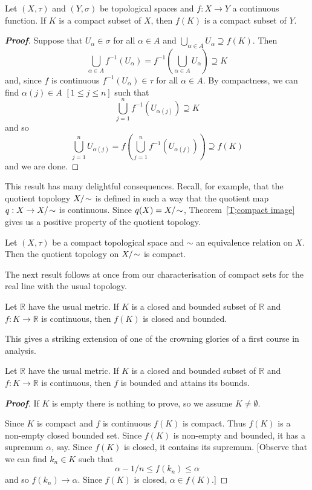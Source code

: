 \begin{theorem}\label{T;compact image}
Let $(X,\tau)$ and $(Y,\sigma)$
be topological spaces and $f:X\rightarrow Y$ a continuous
function. If $K$ is a compact subset of $X$,
then $f(K)$ is a compact subset of $Y$.
\end{theorem}
\begin{proof}[\bf Proof] Suppose that $U_{\alpha}\in\sigma$
for all $\alpha\in A$
and $\bigcup_{\alpha\in A}U_{\alpha}\supseteq f(K)$.
Then
\[\bigcup_{\alpha\in A}f^{-1}(U_{\alpha})
=f^{-1}\left(\bigcup_{\alpha\in A}U_{\alpha}\right)\supseteq K\]
and, since $f$ is continuous $f^{-1}(U_{\alpha})\in\tau$
for all $\alpha\in A$. By compactness, we can find
$\alpha(j)\in A$ $[1\leq j\leq n]$ such that
\[\bigcup_{j=1}^{n}f^{-1}(U_{\alpha(j)})\supseteq K\]
and so
\[\bigcup_{j=1}^{n}U_{\alpha(j)}=
f\left(\bigcup_{j=1}^{n}f^{-1}(U_{\alpha(j)})\right)
\supseteq f(K)\]
and we are done.
\end{proof}


This result has many delightful consequences.
Recall, for example, that the quotient topology
$X/\negthinspace\sim$ is defined in such a way that the
quotient map $q:X\rightarrow X/\negthinspace\sim$ is continuous.
Since $q(X)=X/\negthinspace\sim$,
Theorem~\ref{T;compact image} gives us
a positive property of the quotient topology.


\begin{theorem}\label{T;quotient compact}
Let $(X,\tau)$ be a compact topological space
and $\sim$ an equivalence relation on $X$.
Then the quotient topology on $X/\negthinspace\sim$ is compact.
\end{theorem}

The next result follows at once from our
characterisation of compact sets for the real
line with the usual topology.
\begin{theorem}
Let ${\mathbb R}$ have the usual metric.
If $K$ is a closed and bounded subset of ${\mathbb R}$
and $f:K\rightarrow{\mathbb R}$ is continuous,
then $f(K)$ is closed and bounded.
\end{theorem}
This gives a striking extension of one of the
crowning glories of a first course in analysis.


\begin{theorem}\label{T;attains bounds}
Let ${\mathbb R}$ have the usual metric.
If $K$ is a
closed and bounded subset of ${\mathbb R}$
and $f:K\rightarrow{\mathbb R}$ is continuous,
then $f$ is bounded and attains its bounds.
\end{theorem}
\begin{proof}[\bf Proof] If $K$ is empty there is nothing to prove,
so we assume $K\neq\emptyset$.

Since $K$ is compact and $f$ is continuous
$f(K)$ is compact. Thus $f(K)$ is a non-empty closed
bounded set. Since $f(K)$ is non-empty and bounded,
it has a supremum $\alpha$, say. Since $f(K)$ is closed,
it contains its supremum.
[Observe that we can find $k_{n}\in K$ such that
\[\alpha-1/n\leq f(k_{n})\leq \alpha\]
and so $f(k_{n})\rightarrow\alpha$. Since $f(K)$
is closed, $\alpha\in f(K)$.]
\end{proof}



